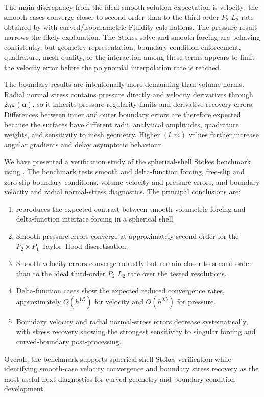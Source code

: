 \documentclass[gmd, manuscript]{copernicus}
\begin{document}
The main discrepancy from the ideal smooth-solution expectation is velocity:
the smooth cases converge closer to second order than to the third-order
\(P_2\) \(L_2\) rate obtained by  with curved/isoparametric
Fluidity calculations. The pressure result narrows the likely explanation. The
Stokes solve and smooth forcing are behaving consistently, but geometry
representation, boundary-condition enforcement, quadrature, mesh quality, or
the interaction among these terms appears to limit the velocity error before
the polynomial interpolation rate is reached.

The boundary results are intentionally more demanding than volume norms.
Radial normal stress contains pressure directly and velocity derivatives
through \(2\eta\boldsymbol{\varepsilon}(\mathbf{u})\), so it inherits pressure
regularity limits and derivative-recovery errors. Differences between inner and
outer boundary errors are therefore expected because the surfaces have
different radii, analytical amplitudes, quadrature weights, and sensitivity to
mesh geometry. Higher \((l,m)\) values further increase angular gradients and
delay asymptotic behaviour.

\conclusions

We have presented a verification study of the 
spherical-shell Stokes benchmark using . The benchmark
tests smooth and delta-function forcing, free-slip and zero-slip boundary
conditions, volume velocity and pressure errors, and boundary velocity and
radial normal-stress diagnostics. The principal conclusions are:
\begin{enumerate}
  \item {} reproduces the expected contrast between
  smooth volumetric forcing and delta-function interface forcing in a
  spherical shell.
  \item Smooth pressure errors converge at approximately second order for the
  \(P_2\times P_1\) Taylor--Hood discretisation.
  \item Smooth velocity errors converge robustly but remain closer to second
  order than to the ideal third-order \(P_2\) \(L_2\) rate over the tested
  resolutions.
  \item Delta-function cases show the expected reduced convergence rates,
  approximately \(O(h^{1.5})\) for velocity and \(O(h^{0.5})\) for pressure.
  \item Boundary velocity and radial normal-stress errors decrease
  systematically, with stress recovery showing the strongest sensitivity to
  singular forcing and curved-boundary post-processing.
\end{enumerate}
Overall, the benchmark supports  spherical-shell Stokes
verification while identifying smooth-case velocity convergence and boundary
stress recovery as the most useful next diagnostics for curved geometry and
boundary-condition development.



\end{document}
